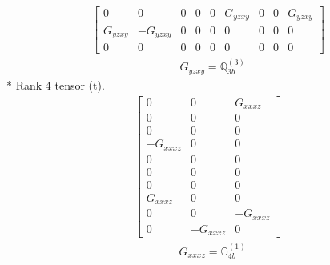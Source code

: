 \documentclass[fleqn,8pt,landscape]{jsarticle}
\begin{document}
\begin{align*}
\begin{bmatrix} 0 & 0 & 0 & 0 & 0 & G_{yzxy} & 0 & 0 & G_{yzxy} \\ G_{yzxy} & - G_{yzxy} & 0 & 0 & 0 & 0 & 0 & 0 & 0 \\ 0 & 0 & 0 & 0 & 0 & 0 & 0 & 0 & 0 \end{bmatrix}
\end{align*}
\begin{align*}
& G_{yzxy} = \mathbb{Q}_{3b}^{(3)}
\end{align*}
* Rank 4 tensor (t).
\begin{align*}
\begin{bmatrix} 0 & 0 & G_{xxxz} \\ 0 & 0 & 0 \\ 0 & 0 & 0 \\ - G_{xxxz} & 0 & 0 \\ 0 & 0 & 0 \\ 0 & 0 & 0 \\ 0 & 0 & 0 \\ G_{xxxz} & 0 & 0 \\ 0 & 0 & - G_{xxxz} \\ 0 & - G_{xxxz} & 0 \end{bmatrix}
\end{align*}
\begin{align*}
& G_{xxxz} = \mathbb{G}_{4b}^{(1)}
\end{align*}
\end{document}
